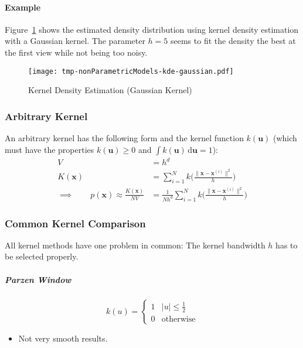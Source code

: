 \documentclass[a4paper, 11pt, accentcolor = tud3b]{tudreport}
\newcommand{\abs}[1]{\ensuremath{\lvert #1 \rvert}}
\newcommand{\dif}[1]{\ensuremath{\,\mathrm{d}#1}}
\renewcommand{\vec}[1]{\mathbf{#1}}
\begin{document}
					\paragraph{Example}
						Figure~\ref{fig:kdeGaussian} shows the estimated density distribution using kernel density estimation with a Gaussian kernel. The parameter \( h = 5 \) seems to fit the density the best at the first view while not being too noisy.

						\begin{figure}
							\centering
							\texttt{[image: tmp-nonParametricModels-kde-gaussian.pdf]}
							\caption{Kernel Density Estimation (Gaussian Kernel)}
							\label{fig:kdeGaussian}
						\end{figure}

				\subsubsection{Arbitrary Kernel}
					An arbitrary kernel has the following form and the kernel function \( k(\vec{u}) \) (which must have the properties \( k(\vec{u}) \geq 0 \) and \( \int k(\vec{u}) \dif{\vec{u}} = 1 \)):
					\begin{align}
						V &= h^d \\
						K(\vec{x}) &= \sum_{i = 1}^{N} k\Bigg( \frac{\lVert \vec{x} - \vec{x}^{(i)} \rVert^2}{h} \Bigg) \\
						\implies\qquad p(\vec{x}) \approx \frac{K(\vec{x})}{NV} &= \frac{1}{Nh^d} \sum_{i = 1}^{N} k\Bigg( \frac{\lVert \vec{x} - \vec{x}^{(i)} \rVert^2}{h} \Bigg)
					\end{align}

				\subsubsection{Common Kernel Comparison}
					All kernel methods have one problem in common: The kernel bandwidth \(h\) has to be selected properly.

					\subparagraph{Parzen Window}
					\begin{equation}
						k(u) =
							\begin{cases}
								1 & \abs{u} \leq \frac{1}{2} \\
								0 & \textrm{otherwise}
							\end{cases}
					\end{equation}
					\begin{itemize}
						\item Not very smooth results.
					\end{itemize}
\end{document}
